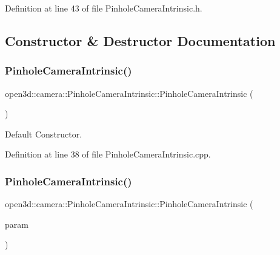 Definition at line 43 of file Pinhole\+Camera\+Intrinsic.\+h.



\subsection{Constructor \& Destructor Documentation}
\mbox{\label{classopen3d_1_1camera_1_1_pinhole_camera_intrinsic_a59768338fc10de4e43a8e120ab11c3f9}} 
\subsubsection{\texorpdfstring{PinholeCameraIntrinsic()}{PinholeCameraIntrinsic()}\hspace{0.1cm}{\footnotesize\ttfamily [1/3]}}
{\footnotesize\ttfamily open3d\+::camera\+::\+Pinhole\+Camera\+Intrinsic\+::\+Pinhole\+Camera\+Intrinsic (\begin{DoxyParamCaption}{ }\end{DoxyParamCaption})}



Default Constructor. 



Definition at line 38 of file Pinhole\+Camera\+Intrinsic.\+cpp.

\mbox{\label{classopen3d_1_1camera_1_1_pinhole_camera_intrinsic_a66efe2d0836fecf418196753adec5676}} 
\subsubsection{\texorpdfstring{PinholeCameraIntrinsic()}{PinholeCameraIntrinsic()}\hspace{0.1cm}{\footnotesize\ttfamily [2/3]}}
{\footnotesize\ttfamily open3d\+::camera\+::\+Pinhole\+Camera\+Intrinsic\+::\+Pinhole\+Camera\+Intrinsic (\begin{DoxyParamCaption}\item[{\mbox{\hyperlink{namespaceopen3d_1_1camera_a57dc47ff7ac14e5f8be58be554497793}{Pinhole\+Camera\+Intrinsic\+Parameters}}}]{param }\end{DoxyParamCaption})}



